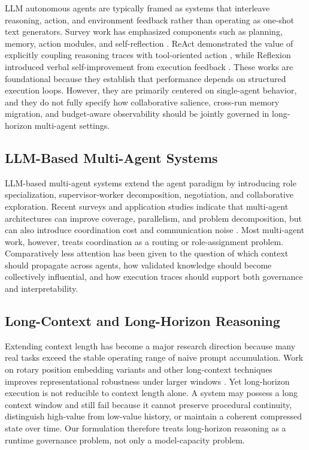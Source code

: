 \documentclass[a4paper,fleqn]{cas-sc}
\begin{document}
LLM autonomous agents are typically framed as systems that interleave reasoning, action, and environment feedback rather than operating as one-shot text generators. Survey work has emphasized components such as planning, memory, action modules, and self-reflection \citep{wang2024survey}. ReAct demonstrated the value of explicitly coupling reasoning traces with tool-oriented action \citep{yao2023react}, while Reflexion introduced verbal self-improvement from execution feedback \citep{shinn2023reflexion}. These works are foundational because they establish that performance depends on structured execution loops. However, they are primarily centered on single-agent behavior, and they do not fully specify how collaborative salience, cross-run memory migration, and budget-aware observability should be jointly governed in long-horizon multi-agent settings.

\subsection{LLM-Based Multi-Agent Systems}

LLM-based multi-agent systems extend the agent paradigm by introducing role specialization, supervisor-worker decomposition, negotiation, and collaborative exploration. Recent surveys and application studies indicate that multi-agent architectures can improve coverage, parallelism, and problem decomposition, but can also introduce coordination cost and communication noise \citep{jimenezromero2025mas, wooldridge2009}. Most multi-agent work, however, treats coordination as a routing or role-assignment problem. Comparatively less attention has been given to the question of which context should propagate across agents, how validated knowledge should become collectively influential, and how execution traces should support both governance and interpretability.

\subsection{Long-Context and Long-Horizon Reasoning}

Extending context length has become a major research direction because many real tasks exceed the stable operating range of naive prompt accumulation. Work on rotary position embedding variants and other long-context techniques improves representational robustness under larger windows \citep{li2024sbarope}. Yet long-horizon execution is not reducible to context length alone. A system may possess a long context window and still fail because it cannot preserve procedural continuity, distinguish high-value from low-value history, or maintain a coherent compressed state over time. Our formulation therefore treats long-horizon reasoning as a runtime governance problem, not only a model-capacity problem.
\end{document}
